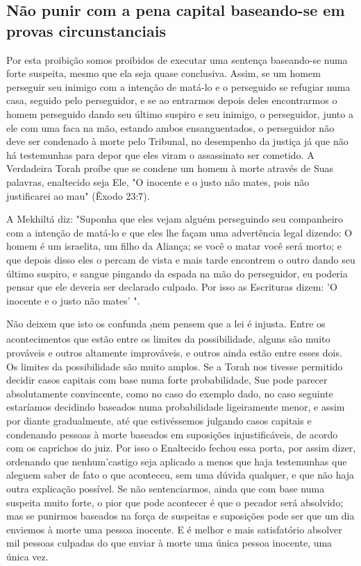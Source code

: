 \begin{itemize}
\begin{enumrate}
\begin{itemize}
\begin{itemize}
\begin{itemize}
\section{Não punir com a pena capital baseando-se em provas circunstanciais}

Por esta proibição somos proibidos de executar uma sentença baseando-se
numa forte suspeita, mesmo que ela seja quase conclusiva. Assim, se um
homem perseguir seu inimigo com a intenção de matá-lo e o perseguido se
refugiar numa casa, seguido pelo perseguidor, e se ao entrarmos depois
de­les encontrarmos o homem perseguido dando seu último suspiro e seu
inimi­go, o perseguidor, junto a ele com uma faca na mão, estando ambos
ensanguen­tados, o perseguidor não deve ser condenado à morte pelo
Tribunal, no de­sempenho da justiça já que não há testemunhas para depor
que eles viram o assassinato ser cometido. A Verdadeira Torah proíbe que
se condene um ho­mem à morte através de Suas palavras, enaltecido seja
Ele, "O inocente e o jus­to não mates, pois não justificarei ao mau"
(Êxodo 23:7).

A Mekhiltá diz: "Suponha que eles vejam alguém perseguindo seu
companheiro com a intenção de matá-lo e que eles lhe façam uma
advertência legal dizendo: O homem é um israelita, um filho da Aliança;
se você o matar você será morto; e que depois disso eles o percam de
vista e mais tarde encon­trem o outro dando seu último suspiro, e sangue
pingando da espada na mão do perseguidor, eu poderia pensar que ele
deveria ser declarado culpado. Por isso as Escrituras dizem: 'O inocente
e o justo não mates' ".

Não deixem que isto os confunda \textsubscript{!}nem pensem que a lei é
injusta. Entre os acontecimentos que estão entre os limites da
possibilidade, alguns são muito prováveis e outros altamente
improváveis, e outros ainda estão entre es­ses dois. Os limites da
possibilidade são muito amplos. Se a Torah nos tivesse permitido decidir
casos capitais com base numa forte probabilidade, Sue pode parecer
absolutamente convincente, como no caso do exemplo dado, no caso
seguinte estaríamos decidindo baseados numa probabilidade ligeiramente
me­nor, e assim por diante gradualmente, até que estivéssemos julgando
casos ca­pitais e condenando pessoas à morte baseados em suposições
injustificáveis, de acordo com os caprichos do juiz. Por isso o
Enaltecido fechou essa porta, por assim dizer, ordenando que
nenhum'castigo seja aplicado a menos que ha­ja testemunhas que aleguem
saber de fato o que aconteceu, sem uma dúvida qualquer, e que não haja
outra explicação possível. Se não sentenciarmos, ain­da que com base
numa suspeita muito forte, o pior que pode acontecer é que o pecador
será absolvido; mas se punirmos baseados na força de suspeitas e
suposições pode ser que um dia enviemos à morte uma pessoa inocente. E é
melhor e mais satisfatório absolver mil pessoas culpadas do que enviar à
morte uma única pessoa inocente, uma única vez.


\end{itemize}
\end{itemize}
\end{itemize}
\end{enumrate}
\end{itemize}
